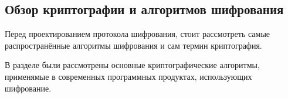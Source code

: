 \subsection{Обзор криптографии и алгоритмов шифрования}
\label{sec:analysis:research:crypto}

Перед проектированием протокола шифрования, стоит рассмотреть самые распространённые алгоритмы шифрования и сам термин криптография.





В разделе были рассмотрены основные криптографические алгоритмы, применямые в современных программных продуктах, использующих шифрование.